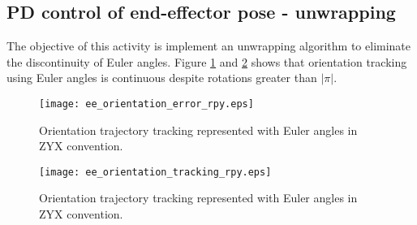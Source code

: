 \graphicspath{{images/act_3.4/}}
\setcounter{subsection}{3}
\subsection{PD control of end-effector pose - unwrapping}
The objective of this activity is implement an unwrapping algorithm to eliminate the discontinuity of Euler angles. Figure \ref{fig:act_3.4_ee_orientation_error} and \ref{fig:act_3.4_ee_orientation_tracking_rpy} shows that orientation tracking using Euler angles is continuous despite rotations greater than $|\pi|$. \vspace{.5cm}

\begin{figure}[H]
	\centering
	\texttt{[image: ee\_orientation\_error\_rpy.eps]}
    \caption{Orientation trajectory tracking represented with Euler angles in ZYX convention.}
    \label{fig:act_3.4_ee_orientation_error}	
\end{figure}


\begin{figure}[H]
	\centering
	\texttt{[image: ee\_orientation\_tracking\_rpy.eps]}
    \caption{Orientation trajectory tracking represented with Euler angles in ZYX convention.}
    \label{fig:act_3.4_ee_orientation_tracking_rpy}	
\end{figure}

